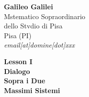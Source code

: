 \documentclass[11pt]{article}
\begin{document}
\begin{minipage}{0.55\linewidth}
\vspace{0.3cm}
{\large{\textbf{\textsf{Galileo Galilei}}}}\\
{\normalfont Mstematico Sopraordinario\\
dello Stvdio di Pisa\\
Pisa (PI)\\
{\textsf{\emph{email[at]domine[dot]xxx}}}}
\end{minipage}
\quad
\begin{minipage}{0.42\linewidth}
\begin{flushright}

{\huge{\textbf{\textsf{Lesson I}}}} \\
{\LARGE{\textbf{{\textsf{Dialogo\\ Sopra i Due\\ Massimi Sistemi
}}}}}\\
\end{flushright}
\end{minipage}
\vspace*{0.3cm}


\textsf{\textbf{
			\lipsum[1]
		}}


\end{document}
